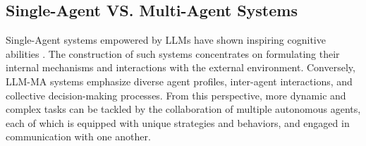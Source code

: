 \subsection{Single-Agent VS. Multi-Agent Systems}
Single-Agent systems empowered by LLMs have shown inspiring cognitive abilities \cite{sumers2023cognitive}. 
The construction of such systems concentrates on formulating their internal mechanisms and interactions with the external environment. Conversely, 
LLM-MA  systems emphasize diverse agent profiles, inter-agent interactions, and collective decision-making processes. From this perspective, more dynamic and complex tasks can be tackled by the collaboration of multiple autonomous agents, each of which is equipped with unique strategies and behaviors, and engaged in communication with one another.



